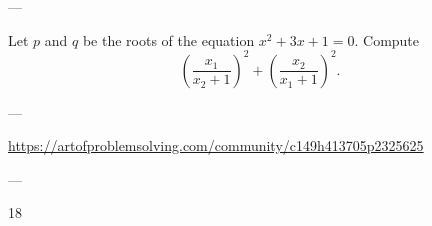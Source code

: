 
---

Let $p$ and $q$ be the roots of the equation $x^2+3x+1=0$. Compute \[\left(\frac{x_1}{x_2+1}\right)^2+\left(\frac{x_2}{x_1+1}\right)^2.\]

---

\url{https://artofproblemsolving.com/community/c149h413705p2325625}

---

18
